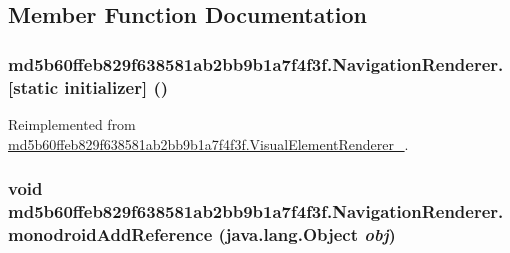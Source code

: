 \subsection{Member Function Documentation}
\hypertarget{classmd5b60ffeb829f638581ab2bb9b1a7f4f3f_1_1_navigation_renderer_f4da07bbbf2b14778d4eadfa5dd3c744}{
\subsubsection[{[static initializer]}]{\setlength{\rightskip}{0pt plus 5cm}md5b60ffeb829f638581ab2bb9b1a7f4f3f.NavigationRenderer.\mbox{[}static initializer\mbox{]} ()}}
\label{classmd5b60ffeb829f638581ab2bb9b1a7f4f3f_1_1_navigation_renderer_f4da07bbbf2b14778d4eadfa5dd3c744}




Reimplemented from \hyperlink{classmd5b60ffeb829f638581ab2bb9b1a7f4f3f_1_1_visual_element_renderer__1_3ae26bd8575212fb6d6f14487b4f48d4}{md5b60ffeb829f638581ab2bb9b1a7f4f3f.VisualElementRenderer\_}.\hypertarget{classmd5b60ffeb829f638581ab2bb9b1a7f4f3f_1_1_navigation_renderer_081007f83180dc47c8fc1b19a1b14c29}{
\subsubsection[{monodroidAddReference}]{\setlength{\rightskip}{0pt plus 5cm}void md5b60ffeb829f638581ab2bb9b1a7f4f3f.NavigationRenderer.monodroidAddReference (java.lang.Object {\em obj})}}
\label{classmd5b60ffeb829f638581ab2bb9b1a7f4f3f_1_1_navigation_renderer_081007f83180dc47c8fc1b19a1b14c29}




